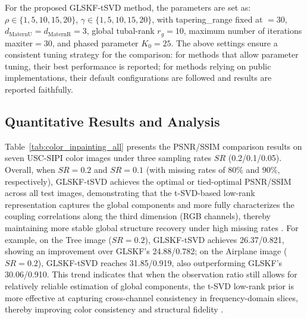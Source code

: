 \documentclass[a4paper,12pt]{article}
\numberwithin{equation}{section}
\numberwithin{algorithm}{section}
\theoremstyle{remark}
\theoremstyle{definition}
\begin{document}
For the proposed GLSKF-tSVD method, the parameters are set as: $\rho\in\{1,5,10,15,20\}$, $\gamma\in\{1,5,10,15,20\}$,
with tapering\_range fixed at $=30$, $d_{\text{MaternU}}=d_{\text{MaternR}}=3$,
global tubal-rank $r_g=10$, maximum number of iterations maxiter$=30$, and phased parameter $K_0=25$.
The above settings ensure a consistent tuning strategy for the comparison: for methods that allow parameter tuning, their best performance is reported; for methods relying on public implementations, their default configurations are followed and results are reported faithfully.


\subsection{Quantitative Results and Analysis}  
Table~\ref{tab:color_inpainting_all} presents the PSNR/SSIM comparison results on seven USC-SIPI color images under three sampling rates $SR$ (0.2/0.1/0.05).  
Overall, when $SR=0.2$ and $SR=0.1$ (with missing rates of $80\%$ and $90\%$, respectively), GLSKF-tSVD achieves the optimal or tied-optimal PSNR/SSIM across all test images, demonstrating that the t-SVD-based low-rank representation captures the global components and more fully characterizes the coupling correlations along the third dimension (RGB channels), thereby maintaining more stable global structure recovery under high missing rates \cite{kilmer2013operators}.  
For example, on the Tree image ($SR=0.2$), GLSKF-tSVD achieves 26.37/0.821, showing an improvement over GLSKF’s 24.88/0.782; on the Airplane image ($SR=0.2$), GLSKF-tSVD reaches 31.85/0.919, also outperforming GLSKF’s 30.06/0.910.  
This trend indicates that when the observation ratio still allows for relatively reliable estimation of global components, the t-SVD low-rank prior is more effective at capturing cross-channel consistency in frequency-domain slices, thereby improving color consistency and structural fidelity \cite{zhang2017tsvd}.
\end{document}
